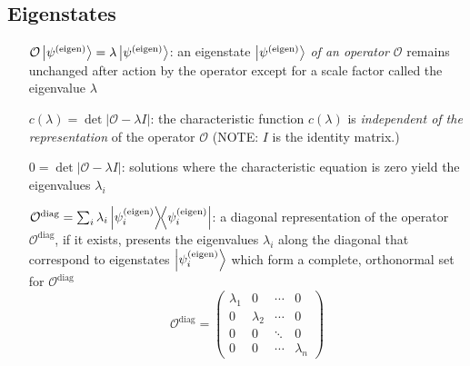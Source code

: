 \subsection*{Eigenstates}
\begin{itemize}
\item [$\mathcal{O}\ket{\psi^{\text{(eigen)}}} = \lambda
  \ket{\psi^{\text{(eigen)}}}$:] an eigenstate $\ket{\psi^{\text{(eigen)}}}$
  \emph{of an operator} $\mathcal{O}$ remains unchanged after action by the
  operator except for a scale factor called the eigenvalue $\lambda$
\item [$c(\lambda) = \det \lvert \mathcal{O} - \lambda I \rvert$:] the
  characteristic function $c(\lambda)$ is \emph{independent of the
  representation} of the operator $\mathcal{O}$ (NOTE: $I$ is the identity
  matrix.) 
\item [$0 = \det \lvert \mathcal{O} - \lambda I \rvert$:] solutions where the
  characteristic equation is zero yield the eigenvalues $\lambda_i$
\item [$\mathcal{O}^{\text{diag}} = \sum_{i}
  \lambda_i\dyad{\psi_i^{\text{(eigen)}}}$:] a diagonal representation of
  the operator $\mathcal{O}^{\text{diag}}$, if it exists, presents the
  eigenvalues $\lambda_i$ along the diagonal that correspond to 
  eigenstates $\ket{\psi_i^{\text{(eigen)}}}$ which form a complete,
  orthonormal set for $\mathcal{O}^{\text{diag}}$
  \begin{equation*}
    \textstyle %
    \mathcal{O}^{\text{diag}} = %
    \begin{pmatrix}
      \lambda_1 & 0 & \cdots & 0 \\
      0 & \lambda_2 & \cdots & 0 \\
      0 & 0 & \ddots & 0 \\
      0 & 0 & \cdots & \lambda_n
    \end{pmatrix}
  \end{equation*}
\end{itemize}
